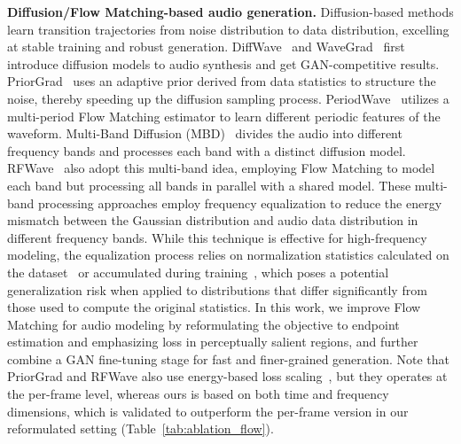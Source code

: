 \noindent\textbf{Diffusion/Flow Matching-based audio generation.}
Diffusion-based methods learn transition trajectories from noise distribution to data distribution, excelling at stable training and robust generation. 
DiffWave~\citep{diffwave} and WaveGrad~\citep{Wavegrad} first introduce diffusion models to audio synthesis and get GAN-competitive results. PriorGrad~\citep{priorgrad} uses an adaptive prior derived from data statistics to structure the noise, thereby speeding up the diffusion sampling process. 
PeriodWave~\citep{periodwave} utilizes a multi-period Flow Matching estimator to learn different periodic features of the waveform.
Multi-Band Diffusion (MBD)~\citep{mbd} divides the audio into different frequency bands and processes each band with a distinct diffusion model. RFWave~\citep{rfwave} also adopt this multi-band idea, employing Flow Matching to model each band but processing all bands in parallel with a shared model. These multi-band processing approaches employ frequency equalization to reduce the energy mismatch between the Gaussian distribution and audio data distribution in different frequency bands. While this technique is effective for high-frequency modeling, the equalization process relies on normalization statistics calculated on the dataset~\citep{mbd} or accumulated during training~\citep{rfwave}, which poses a potential generalization risk when applied to distributions that differ significantly from those used to compute the original statistics. 
In this work, we improve Flow Matching for audio modeling by reformulating the objective to endpoint estimation and emphasizing loss in perceptually salient regions, and further combine a GAN fine-tuning stage for fast and finer-grained generation. Note that PriorGrad and RFWave also use energy-based loss scaling~\citep{rfwave}, but they operates at the per-frame level, whereas ours is based on both time and frequency dimensions, which is validated to outperform the per-frame version in our reformulated setting (Table~\ref{tab:ablation_flow}).

